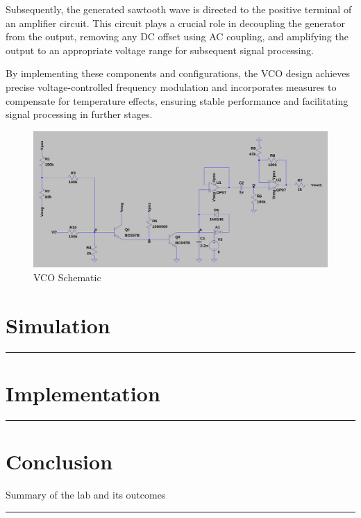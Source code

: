 \documentclass{article}
\begin{document}
Subsequently, the generated sawtooth wave is directed to the positive terminal of an amplifier circuit. This circuit plays a crucial role in decoupling the generator from the output, removing any DC offset using AC coupling, and amplifying the output to an appropriate voltage range for subsequent signal processing.

By implementing these components and configurations, the VCO design achieves precise voltage-controlled frequency modulation and incorporates measures to compensate for temperature effects, ensuring stable performance and facilitating signal processing in further stages.


\begin{figure}[H]
  \includegraphics[width=1\linewidth]{vco_schem.png}
  \caption{VCO Schematic}
\end{figure}


\section*{\textcolor{mycolor}{Simulation}}
\vspace{5mm}
\hrule


\section*{\textcolor{mycolor}{Implementation}}
\vspace{5mm}
\hrule

\section*{\textcolor{mycolor}{Conclusion}}
Summary of the lab and its outcomes
\vspace{5mm}
\hrule
\end{document}
